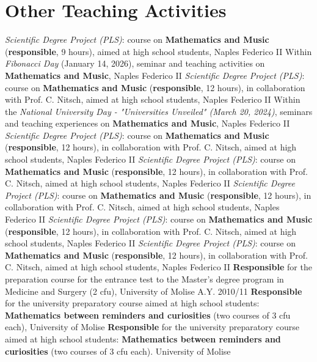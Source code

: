 \documentclass[11pt,a4paper,sans,colorlinks,linkcolor=green]{moderncv}
\begin{document}
\section{Other Teaching Activities}
{ \textit{Scientific Degree Project (PLS)}: course on \textbf{Mathematics and Music} (\textbf{responsible}, 9 hours), aimed at high school students, Naples Federico II}
{Within \textit{Fibonacci Day} (January 14, 2026), seminar and teaching activities on \textbf{Mathematics and Music}, Naples Federico II}
{ \textit{Scientific Degree Project (PLS)}: course on \textbf{Mathematics and Music} (\textbf{responsible}, 12 hours), in collaboration with Prof. C. Nitsch, aimed at high school students, Naples Federico II}
{Within the \textit{National University Day - "Universities Unveiled" (March 20, 2024)}, seminars and teaching experiences on \textbf{Mathematics and Music}, Naples Federico II}
{ \textit{Scientific Degree Project (PLS)}: course on \textbf{Mathematics and Music} (\textbf{responsible}, 12 hours), in collaboration with Prof. C. Nitsch, aimed at high school students, Naples Federico II}
{ \textit{Scientific Degree Project (PLS)}: course on \textbf{Mathematics and Music} (\textbf{responsible}, 12 hours), in collaboration with Prof. C. Nitsch, aimed at high school students, Naples Federico II}
{ \textit{Scientific Degree Project (PLS)}: course on \textbf{Mathematics and Music} (\textbf{responsible}, 12 hours), in collaboration with Prof. C. Nitsch, aimed at high school students, Naples Federico II}
{ \textit{Scientific Degree Project (PLS)}: course on \textbf{Mathematics and Music} (\textbf{responsible}, 12 hours), in collaboration with Prof. C. Nitsch, aimed at high school students, Naples Federico II}
{ \textit{Scientific Degree Project (PLS)}: course on \textbf{Mathematics and Music} (\textbf{responsible}, 12 hours), in collaboration with Prof. C. Nitsch, aimed at high school students, Naples Federico II}
{    \textbf{{Responsible}} for the preparation course for the entrance test to the Master's degree program in Medicine and Surgery (2 cfu), University of Molise}
  \cvitem
    {A.Y. 2010/11}
{\textbf{{Responsible}} for the university preparatory course aimed at high school students: \textbf{Mathematics between reminders and curiosities} (two courses of 3 cfu each), University of Molise}
{\textbf{{Responsible}} for the university preparatory course aimed at high school students: \textbf{Mathematics between reminders and curiosities} (two courses of 3 cfu each). University of Molise}
\end{document}
